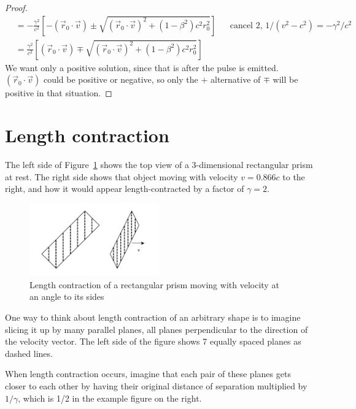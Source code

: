 \documentclass[a4paper]{article}
\theoremstyle{plain}
\theoremstyle{definition}
\newcommand{\vect}[1]{\vec{#1}}
\begin{document}
\begin{proof}
\begin{align*}
  & = -\frac{\gamma^2}{c^2} \left[ -(\vect{r}_0 \cdot \vect{v}) \pm \sqrt{(\vect{r}_0 \cdot \vect{v})^2 + (1-\beta^2)c^2 r_0^2} \right] & & \text{cancel 2, $1/(v^2-c^2) = -\gamma^2/c^2$} \\
  & = \frac{\gamma^2}{c^2} \left[ (\vect{r}_0 \cdot \vect{v}) \mp \sqrt{(\vect{r}_0 \cdot \vect{v})^2 + (1-\beta^2)c^2 r_0^2} \right]
\end{align*}
We want only a positive solution, since that is after the pulse is
emitted.  $(\vect{r}_0 \cdot \vect{v})$ could be positive or negative,
so only the $+$ alternative of $\mp$ will be positive in that
situation.
\end{proof}


\section{Length contraction}
\label{app:length-contraction}

The left side of Figure~\ref{fig:diagonal-length-contraction} shows
the top view of a 3-dimensional rectangular prism at rest.  The right
side shows that object moving with velocity $v=0.866c$ to the right,
and how it would appear length-contracted by a factor of $\gamma=2$.
\begin{figure}[ht]
	\centering
	\includegraphics[width=0.5\textwidth]{length-contraction-rectangle-at-angle-cropped.pdf}
	\caption{Length contraction of a rectangular prism moving with velocity at an angle to its sides}
	\label{fig:diagonal-length-contraction}
\end{figure}

One way to think about length contraction of an arbitrary shape is to
imagine slicing it up by many parallel planes, all planes
perpendicular to the direction of the velocity vector.  The left side
of the figure shows 7 equally spaced planes as dashed lines.

When length contraction occurs, imagine that each pair of these planes
gets closer to each other by having their original distance of
separation multiplied by $1/\gamma$, which is 1/2 in the example
figure on the right.
\end{document}
